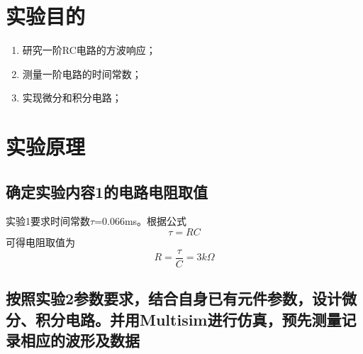 \documentclass{ctexart}
\begin{document}
\section{实验目的}
\begin{enumerate}
    \item 研究一阶RC电路的方波响应；
    \item 测量一阶电路的时间常数；
    \item 实现微分和积分电路；
\end{enumerate}
\section{实验原理}
\subsection{确定实验内容1的电路电阻取值}
实验1要求时间常数$\tau$=0.066ms。根据公式
\begin{equation}
    \tau=RC
\end{equation}
可得电阻取值为
\begin{equation}
    R=\dfrac{\tau}{C}=3k\Omega
\end{equation}
\subsection{按照实验2参数要求，结合自身已有元件参数，设计微分、积分电路。并用Multisim进行仿真，预先测量记录相应的波形及数据}
\end{document}
